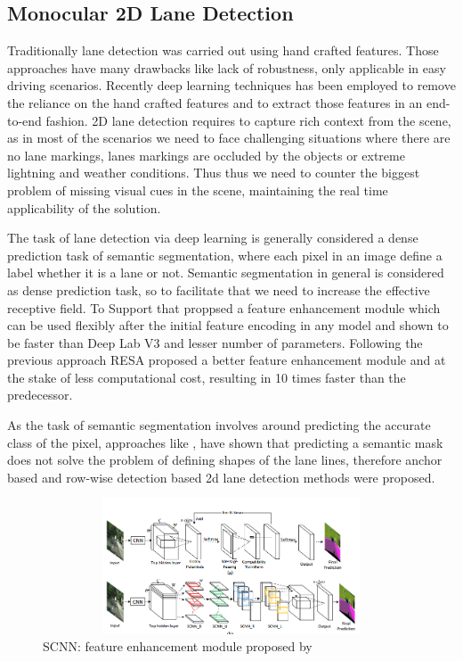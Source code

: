         \subsection{Monocular 2D Lane Detection}
        Traditionally lane detection was carried out using hand crafted features. Those approaches have many drawbacks like lack of robustness, only applicable in easy driving scenarios. Recently deep learning techniques has been employed to remove the reliance on the hand crafted features and to extract those features in an end-to-end fashion. 2D lane detection requires to capture rich context from the scene, as in most of the scenarios we need to face challenging situations where there are no lane markings, lanes markings are occluded by the objects or extreme lightning and weather conditions. Thus thus we need to counter the biggest problem of missing visual cues in the scene, maintaining the real time applicability of the solution.
        
        The task of lane detection via deep learning is generally considered a dense prediction task of semantic segmentation, where each pixel in an image define a label whether it is a lane or not. Semantic segmentation in general is considered as dense prediction task, so to facilitate that we need to increase the effective receptive field. To Support that \cite{DBLP:journals/corr/abs-1712-06080} proppsed a feature enhancement module which can be used flexibly after the initial feature encoding in any model and shown to be faster than Deep Lab V3 \cite{DBLP:journals/corr/ChenPSA17} and lesser number of parameters. Following the previous approach RESA \cite{DBLP:journals/corr/abs-2008-13719} proposed a better feature enhancement module and at the stake of less computational cost, resulting in 10 times faster than the predecessor. 
        
        As the task of semantic segmentation involves around predicting the accurate class of the pixel, approaches like \cite{https://doi.org/10.48550/arxiv.2010.12035}, \cite{inbook} have shown that predicting a semantic mask does not solve the problem of defining shapes of the lane lines, therefore anchor based and row-wise detection based 2d lane detection methods were proposed.
        
         \begin{figure}[h]
    \centering
\includegraphics[width=12cm, height=4cm]{images/scnn_module.png}
    \caption{SCNN: feature enhancement module proposed by  \cite{DBLP:journals/corr/abs-1712-06080}}
    \end{figure}
    
